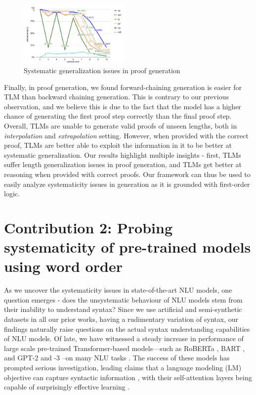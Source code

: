 \documentclass[12pt]{article}
\begin{document}
\begin{figure}
\begin{center}
  \includegraphics[width=0.48\textwidth]{images/proof_sys_gen.pdf}
\end{center}
\caption{Systematic generalization issues in proof generation}
\label{fig:proof_sys_gen}
\end{figure}


Finally, in proof generation, we found forward-chaining generation is easier for TLM than backward chaining generation. This is contrary to our previous observation, and we believe this is due to the fact that the model has a higher chance of generating the first proof step correctly than the final proof step. Overall, TLMs are unable to generate valid proofs of unseen lengths, both in \textit{interpolation} and \textit{extrapolation} setting. However, when provided with the correct proof, TLMs are better able to exploit the information in it to be better at systematic generalization. Our results highlight multiple insights - first, TLMs suffer length generalization issues in proof generation, and TLMs get better at reasoning when provided with correct proofs. Our framework can thus be used to easily analyze systematicity issues in generation as it is grounded with first-order logic.

\section{Contribution 2: Probing systematicity of pre-trained models using word order}
\label{sec:cont2}

As we uncover the systematicity issues in state-of-the-art NLU models, one question emerges - does the unsystematic behaviour of NLU models stem from their inability to understand syntax? Since we use artificial and semi-synthetic datasets in all our prior works, having a rudimentary variation of syntax, our  findings naturally raise questions on the actual syntax understanding capabilities of NLU models. Of late, we have witnessed a steady increase in performance of large scale pre-trained Transformer-based \cite{vaswani-etal-2017-attention} models---such as RoBERTa \cite{liu-et-al-2019-roberta}, BART \cite{lewis-etal-2020-bart}, and GPT-2 and -3 \cite{radford-etal-2019-language,brown-etal-2020-gpt3}--on many NLU tasks \cite{wang-etal-2018-glue, wang-etal-2019-superglue}. The success of these models has prompted serious investigation, leading claims that a language modeling (LM) objective can capture syntactic information \cite{hewitt-manning-2019-structural,jawahar-etal-2019-bert, warstadt-bowman-2020-can, wu-etal-2020-perturbed}, with their self-attention layers being capable of surprisingly effective learning \cite{rogers2020}.
\end{document}
